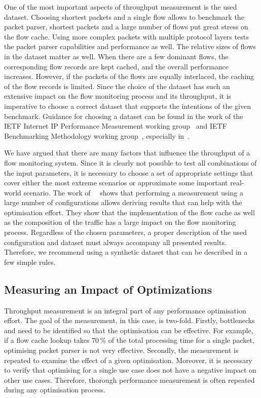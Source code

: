One of the most important aspects of throughput measurement is the used dataset. Choosing shortest packets and a single flow allows to benchmark the packet parser, shortest packets and a large number of flows put great stress on the flow cache. Using more complex packets with multiple protocol layers tests the packet parser capabilities and performance as well. The relative sizes of flows in the dataset matter as well. When there are a few dominant flows, the corresponding flow records are kept cached, and the overall performance increases. However, if the packets of the flows are equally interlaced, the caching of the flow records is limited. Since the choice of the dataset has such an extensive impact on the flow monitoring process and its throughput, it is imperative to choose a correct dataset that supports the intentions of the given benchmark. Guidance for choosing a dataset can be found in the work of the IETF Internet IP Performance Measurement working group~\cite{IESG-1997-IP} and IETF Benchmarking Methodology working group~\cite{IESG-1989-Benchmarking}, especially in~\cite{rfc2330, rfc6985}.

We have argued that there are many factors that influence the throughput of a flow monitoring system. Since it is clearly not possible to test all combinations of the input parameters, it is necessary to choose a set of appropriate settings that cover either the most extreme scenarios or approximate some important real-world scenario. The work of~\citeauthor{Nassopulos-2014-Flow}~\cite{Nassopulos-2014-Flow} shows that performing a measurement using a large number of configurations allows deriving results that can help with the optimisation effort. They show that the implementation of the flow cache as well as the composition of the traffic has a large impact on the flow monitoring process. Regardless of the chosen parameters, a proper description of the used configuration and dataset must always accompany all presented results. Therefore, we recommend using a synthetic dataset that can be described in a few simple rules.


\subsection{Measuring an Impact of Optimizations}

Throughput measurement is an integral part of any performance optimisation effort. The goal of the measurement, in this case, is two-fold. Firstly, bottlenecks and need to be identified so that the optimisation can be effective. For example, if a flow cache lookup takes 70\,\% of the total processing time for a single packet, optimising packet parser is not very effective. Secondly, the measurement is repeated to examine the effect of a given optimisation. Moreover, it is necessary to verify that optimising for a single use case does not have a negative impact on other use cases. Therefore, thorough performance measurement is often repeated during any optimisation process.

